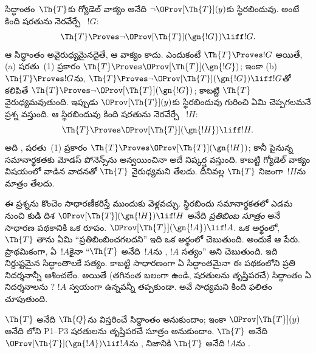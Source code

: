 \documentclass[../../../include/open-logic-section]{subfiles}
\begin{document}


సిద్ధాంతం~$\Th{T}$కు గ్యోడెల్ వాక్యం అనేది $\lnot
\OProv[\Th{T}](y)$కు స్థిరబిందువు. అంటే కింది షరతును నెరవేర్చే
~$!G$:
\[
\Th{T} \Proves \lnot \OProv[\Th{T}](\gn{!G}) \liff !G.
\]
ఆ సిద్ధాంతం అవైరుధ్యమైనదైతే, ఆ వాక్యం  కాదు. ఎందుకంటే $\Th{T} \Proves !G$ అయితే,
(a)  షరతు~(1) ప్రకారం
$\Th{T} \Proves \OProv[\Th{T}](\gn{!G})$; ఇంకా (b)
$\Th{T} \Proves !G$ను, $\Th{T} \Proves \lnot \OProv[\Th{T}](\gn{!G})
\liff !G$తో కలిపితే $\Th{T} \Proves \lnot \OProv[\Th{T}](\gn{!G})$;
కాబట్టి $\Th{T}$ వైరుధ్యమవుతుంది. ఇప్పుడు $\OProv[\Th{T}](y)$కు
స్థిరబిందువు గురించి ఏమి చెప్పగలమనే ప్రశ్న వస్తుంది. ఆ స్థిరబిందువు కింది షరతును నెరవేర్చే
~$!H$:
\[
\Th{T} \Proves \OProv[\Th{T}](\gn{!H}) \liff !H.
\]
అది , షరతు~(1) ప్రకారం
$\Th{T} \Proves \OProv[\Th{T}](\gn{!H})$; కానీ పైనున్న సమానార్థకతకు
మోడస్ పోనెన్స్‌ను అన్వయించినా అదే నిష్కర్ష వస్తుంది. కాబట్టి గ్యోడెల్ వాక్యం
విషయంలో వాడిన వాదనతో $\Th{T}$ వైరుధ్యమని తేలదు. దీనివల్ల $\Th{T}$
నిజంగా~$!H$ను  మాత్రం తేలదు.

ఈ ప్రశ్నను కొంచెం సాధారణీకరిస్తే ముందుకు వెళ్లవచ్చు. స్థిరబిందు సమానార్థకతలో
ఎడమ నుంచి కుడి దిశ $\OProv[\Th{T}](\gn{!H}) \lif !H$ అనేది
\emph{ప్రతిబింబ సూత్రం} అనే సాధారణ పథకానికి ఒక రూపం.
$\OProv[\Th{T}](\gn{!A}) \lif !A$. ఒక అర్థంలో, $\Th{T}$ తాను ఏమి
 ``ప్రతిబింబించగలదని'' ఇది ఒక అర్థంలో చెబుతుంది. అందుకే ఆ పేరు.
ప్రాథమికంగా, ఏ~$!A$కైనా ``$\Th{T}$ అనేది~$!A$ను ,
$!A$ సత్యం'' అని చెబుతుంది. ఇది నిర్దుష్టమైన సిద్ధాంతాలకే సత్యం. కాబట్టి సాధారణంగా ఏ సిద్ధాంతమైనా
ఈ పథకంలోని ప్రతి నిదర్శనాన్నీ  ఆశించలేం. అయితే (తగినంత బలంగా ఉండి,
 షరతులను తృప్తిపరచే) సిద్ధాంతం ఏ నిదర్శనాలను
? $!A$ స్వయంగా  ఉన్నవన్నీ తప్పకుండా.
అవే సాధ్యమని కింది ఫలితం చూపుతుంది.

\begin{thm}
$\Th{T}$ అనేది $\Th{Q}$ను విస్తరించే 
సిద్ధాంతం అనుకుందాం; ఇంకా $\OProv[\Th{T}](y)$ అనేది
లోని P1--P3 షరతులను తృప్తిపరచే సూత్రం అనుకుందాం.
$\Th{T}$ అనేది $\OProv[\Th{T}](\gn{!A}) \lif !A$ను
, నిజానికి $\Th{T}$ అనేది $!A$ను .
\end{thm}
\end{document}

